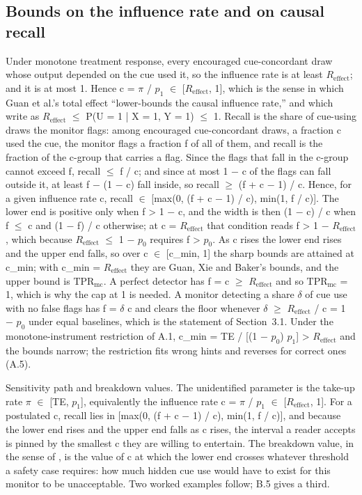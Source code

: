 \documentclass[11pt,a4paper]{article}
\begin{document}
\subsection{Bounds on the influence rate and on causal recall}
Under monotone treatment response, every encouraged cue-concordant draw whose output depended on the cue used it, so the influence rate is at least $R_{\mathrm{effect}}$; and it is at most 1. Hence c = $\pi$ / $p_1$ $\in$ [$R_{\mathrm{effect}}$, 1], which is the sense in which Guan et al.’s total effect “lower-bounds the causal influence rate,” and which \citet*{guan2026beyond} write as $R_{\mathrm{effect}}$ $\leq$ P(U = 1 | X = 1, Y = 1) $\leq$ 1. Recall is the share of cue-using draws the monitor flags: among encouraged cue-concordant draws, a fraction c used the cue, the monitor flags a fraction f of all of them, and recall is the fraction of the c-group that carries a flag. Since the flags that fall in the c-group cannot exceed f, recall $\leq$ f / c; and since at most 1 $-$ c of the flags can fall outside it, at least f $-$ (1 $-$ c) fall inside, so recall $\geq$ (f + c $-$ 1) / c. Hence, for a given influence rate c, recall $\in$ [max(0, (f + c $-$ 1) / c), min(1, f / c)]. The lower end is positive only when f > 1 $-$ c, and the width is then (1 $-$ c) / c when f $\leq$ c and (1 $-$ f) / c otherwise; at c = $R_{\mathrm{effect}}$ that condition reads f > 1 $-$ $R_{\mathrm{effect}}$, which because $R_{\mathrm{effect}}$ $\leq$ 1 $-$ $p_0$ requires f > $p_0$. As c rises the lower end rises and the upper end falls, so over c $\in$ [c\_min, 1] the sharp bounds are attained at c\_min; with c\_min = $R_{\mathrm{effect}}$ they are Guan, Xie and Baker’s bounds, and the upper bound is $\mathrm{TPR}_{\mathrm{mc}}$. A perfect detector has f = c $\geq$ $R_{\mathrm{effect}}$ and so $\mathrm{TPR}_{\mathrm{mc}}$ = 1, which is why the cap at 1 is needed. A monitor detecting a share $\delta$ of cue use with no false flags has f = $\delta$ c and clears the floor whenever $\delta$ $\geq$ $R_{\mathrm{effect}}$ / c = 1 $-$ $p_0$ under equal baselines, which is the statement of Section~3.1. Under the monotone-instrument restriction of A.1, c\_min = TE / [(1 $-$ $p_0$) $p_1$] > $R_{\mathrm{effect}}$ and the bounds narrow; the restriction fits wrong hints and reverses for correct ones (A.5).

Sensitivity path and breakdown values. The unidentified parameter is the take-up rate $\pi$ $\in$ [TE, $p_1$], equivalently the influence rate c = $\pi$ / $p_1$ $\in$ [$R_{\mathrm{effect}}$, 1]. For a postulated c, recall lies in [max(0, (f + c $-$ 1) / c), min(1, f / c)], and because the lower end rises and the upper end falls as c rises, the interval a reader accepts is pinned by the smallest c they are willing to entertain. The breakdown value, in the sense of \citet{rosenbaum2002observational}, is the value of c at which the lower end crosses whatever threshold a safety case requires: how much hidden cue use would have to exist for this monitor to be unacceptable. Two worked examples follow; B.5 gives a third.
\end{document}
